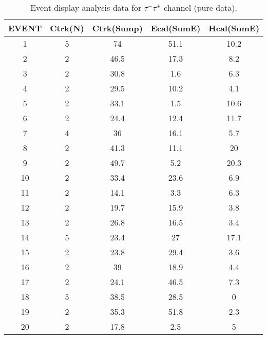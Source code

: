 \begin{table}[h!]
    \centering
    \caption{Event display analysis data for $\tau^-\tau^+$ channel (pure data).}
    \begin{tabular}{ccccc}
    \hline
    EVENT & Ctrk(N) & Ctrk(Sump) & Ecal(SumE) & Hcal(SumE) \\ \hline
    1     & 5       & 74         & 51.1       & 10.2       \\
    2     & 2       & 46.5       & 17.3       & 8.2        \\
    3     & 2       & 30.8       & 1.6        & 6.3        \\
    4     & 2       & 29.5       & 10.2       & 4.1        \\
    5     & 2       & 33.1       & 1.5        & 10.6       \\
    6     & 2       & 24.4       & 12.4       & 11.7       \\
    7     & 4       & 36         & 16.1       & 5.7        \\
    8     & 2       & 41.3       & 11.1       & 20         \\
    9     & 2       & 49.7       & 5.2        & 20.3       \\
    10    & 2       & 33.4       & 23.6       & 6.9        \\
    11    & 2       & 14.1       & 3.3        & 6.3        \\
    12    & 2       & 19.7       & 15.9       & 3.8        \\
    13    & 2       & 26.8       & 16.5       & 3.4        \\
    14    & 5       & 23.4       & 27         & 17.1       \\
    15    & 2       & 23.8       & 29.4       & 3.6        \\
    16    & 2       & 39         & 18.9       & 4.4        \\
    17    & 2       & 24.1       & 46.5       & 7.3        \\
    18    & 5       & 38.5       & 28.5       & 0          \\
    19    & 2       & 35.3       & 51.8       & 2.3        \\
    20    & 2       & 17.8       & 2.5        & 5         \\ \hline
    \end{tabular}
    \label{table:ed-tt}
\end{table}
    
